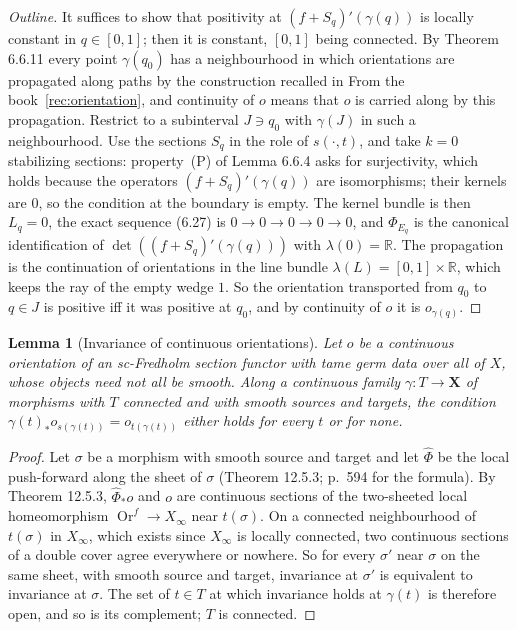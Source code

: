 \documentclass[11pt,a4paper]{article}
\theoremstyle{plain}
\newtheorem{lemma}[theorem]{Lemma}
\theoremstyle{definition}
\theoremstyle{remark}
\newcommand{\R}{\mathbb{R}}
\newcommand{\Or}{\operatorname{Or}}
\begin{document}
\begin{proof}[Outline]
It suffices to show that positivity at $(f+S_q)'(\gamma(q))$ is locally constant in $q\in[0,1]$; then it
is constant, $[0,1]$ being connected. By Theorem 6.6.11 every point $\gamma(q_0)$ has a neighbourhood in
which orientations are propagated along paths by the construction recalled in
From the book~\ref{rec:orientation}, and continuity of $o$ means that $o$ is carried along by this propagation.
Restrict to a subinterval $J\ni q_0$ with $\gamma(J)$ in such a neighbourhood. Use the sections
$S_q$ in the role of $s(\cdot,t)$, and take $k=0$ stabilizing sections: property~(P) of Lemma 6.6.4 asks
for surjectivity, which holds because the operators $(f+S_q)'(\gamma(q))$ are isomorphisms; their kernels are
$0$, so the condition at the boundary is empty. The kernel bundle is then $L_q=0$, the exact sequence (6.27)
is $0\to0\to0\to0\to0$, and $\Phi_{E_q}$ is the canonical identification of $\det((f+S_q)'(\gamma(q)))$
with $\lambda(0)=\R$. The propagation is the continuation of orientations in the line bundle
$\lambda(L)=[0,1]\times\R$, which keeps the ray of the empty wedge $1$. So the orientation transported
from $q_0$ to $q\in J$ is positive iff it was positive at $q_0$, and by continuity of $o$ it is
$o_{\gamma(q)}$.
\end{proof}

\begin{lemma}[Invariance of continuous orientations]\label{lem:inv}
Let $o$ be a continuous orientation of an sc-Fredholm section functor with tame germ data over all of
$X$, whose objects need not all be smooth. Along a continuous family $\gamma\colon T\to\mathbf X$ of
morphisms with $T$ connected and with smooth sources and targets, the condition
$\gamma(t)_*o_{s(\gamma(t))}=o_{t(\gamma(t))}$ either holds for every $t$ or for none.
\end{lemma}

\begin{proof}
Let $\sigma$ be a morphism with smooth source and target and let $\hat\Phi$ be the local push-forward
along the sheet of $\sigma$ (Theorem 12.5.3; p.~594 for the formula). By Theorem 12.5.3, $\hat\Phi_*o$ and
$o$ are continuous sections of the two-sheeted local homeomorphism $\Or^f\to X_\infty$ near
$t(\sigma)$. On a connected neighbourhood of $t(\sigma)$ in $X_\infty$, which exists since $X_\infty$ is
locally connected, two continuous sections of a double cover agree everywhere or nowhere. So for every
$\sigma'$ near $\sigma$ on the same sheet, with smooth source and target, invariance at $\sigma'$ is
equivalent to invariance at $\sigma$. The set of $t\in T$ at which invariance holds at $\gamma(t)$ is
therefore open, and so is its complement; $T$ is connected.
\end{proof}
\end{document}
